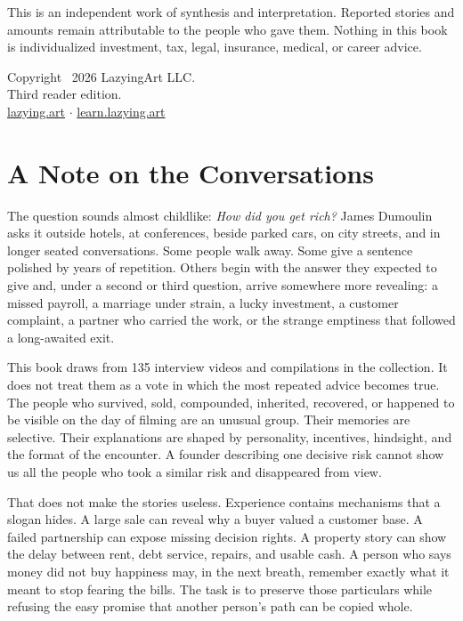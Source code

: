 \vspace{1.2em}

This is an independent work of synthesis and interpretation. Reported stories
and amounts remain attributable to the people who gave them. Nothing in this
book is individualized investment, tax, legal, insurance, medical, or career
advice.

\vfill

{\small
Copyright \textcopyright\ 2026 LazyingArt LLC.\\
Third reader edition.\\
\href{https://lazying.art}{lazying.art} $\boldsymbol{\cdot}$
\href{https://learn.lazying.art}{learn.lazying.art}
\par}

\cleardoublepage
\chapter*{A Note on the Conversations}

The question sounds almost childlike: \emph{How did you get rich?} James
Dumoulin asks it outside hotels, at conferences, beside parked cars, on city
streets, and in longer seated conversations. Some people walk away. Some give a
sentence polished by years of repetition. Others begin with the answer they
expected to give and, under a second or third question, arrive somewhere more
revealing: a missed payroll, a marriage under strain, a lucky investment, a
customer complaint, a partner who carried the work, or the strange emptiness
that followed a long-awaited exit.

This book draws from 135 interview videos and compilations in the collection.
It does not treat them as a vote in which the most repeated advice becomes
true. The people who survived,
sold, compounded, inherited, recovered, or happened to be visible on the day of
filming are an unusual group. Their memories are selective. Their explanations
are shaped by personality, incentives, hindsight, and the format of the
encounter. A founder describing one decisive risk cannot show us all the people
who took a similar risk and disappeared from view.

That does not make the stories useless. Experience contains mechanisms that a
slogan hides. A large sale can reveal why a buyer valued a customer base. A
failed partnership can expose missing decision rights. A property story can
show the delay between rent, debt service, repairs, and usable cash. A person
who says money did not buy happiness may, in the next breath, remember exactly
what it meant to stop fearing the bills. The task is to preserve those
particulars while refusing the easy promise that another person's path can be
copied whole.

